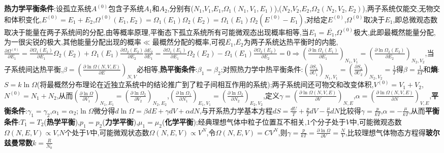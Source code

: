 \documentclass[10pt,a4paper]{article}
\begin{document}
\begin{multicols}{2}
\textbf{热力学平衡条件}:设孤立系统$A^{(0)}$包含子系统$A_1$和$A_2$,分别有($N_1$,$V_1$,$E_1$,$\Omega_1(N_1,V_1,E_1)$),($N_2$,$V_2$,$E_2$,$\Omega_2(N_2,V_2,E_2)$),两子系统仅能交,无物交和体积变化,$E^{(0)}=E_1+E_2$,$\Omega^{(0)}(E_1,E_2)=\Omega_1(E_1)\Omega_2(E_2)=\Omega_1(E_1)\Omega_2(E^{(0)}-E_1)$,对给定$E^{(0)}$,$\Omega^{(0)}$取决于$E_1$,即总微观态数取决于能量在两子系统间的分配,由等概率原理,平衡态下孤立系统所有可能微观态出现概率相等,当$E_1=\overline{E_1}$,$\Omega^{(0)}$极大,此即最概然能量分配,为一很尖锐的极大,其他能量分配出现的概率$\ll$最概然分配的概率,可视$\overline{E_1}$,$\overline{E_2}$为两子系统达热平衡时的内能,$\frac{\partial\Omega^{(0)}}{\partial E_1}=\frac{\partial\Omega_1(E_1)}{\partial E_1}\Omega_2(E_2)+\Omega_1(E_1)\frac{\partial\Omega_2(E_2)}{\partial E_2}\frac{\partial E_2}{\partial E_1}=\frac{\partial\Omega_1(E_1)}{\partial E_1}\Omega_2(E_2)-\Omega_1(E_1)\frac{\partial\Omega_2(E_2)}{\partial E_2}=0\Rightarrow\left(\frac{\partial\ln\Omega_1(E_1)}{\partial E_1}\right)_{N_1,V_1}=\left(\frac{\partial\ln\Omega_2(E_2)}{\partial E_2}\right)_{N_2,V_2}$,当子系统间达热平衡,$\beta=\left(\frac{\partial\ln\Omega(N,V,E)}{\partial E}\right)_{N,V}$必相等,\textbf{热平衡条件}:$\beta_1=\beta_2$;对照热力学中热平衡条件:$\left(\frac{\partial S_1}{\partial U_1}\right)_{N_1,V_1}=\left(\frac{\partial S_2}{\partial U_2}\right)_{N_2,V_2}=\frac{1}{T}$得$\beta=\frac{1}{kT}$和\textbf{熵}:$S=k\ln\Omega$(将最概然分布理论在近独立系统中的结论推广到了粒子间相互作用的系统);两子系统间还可物交和改变体积,$V^{(0)}=V_1+V_2$,$N^{(0)}=N_1+N_2$,从而$\left(\frac{\partial\ln\Omega}{\partial V_1}\right)_{N_1,E_1}=\left(\frac{\partial\ln\Omega_2}{\partial V_2}\right)_{N_2,E_2}$,$\left(\frac{\partial\ln\Omega_1}{\partial N_1}\right)_{E_1,V_1}=\left(\frac{\partial\ln\Omega_2}{\partial N_2}\right)_{E_2,V_2}$,定义$\gamma=\left(\frac{\partial\ln\Omega(N,V,E)}{\partial V}\right)_{N,E}$,$\alpha=\left(\frac{\partial\ln\Omega(N,V,E)}{\partial N}\right)_{V,E}$,\textbf{平衡条件}:$\gamma_1=\gamma_2$,$\alpha_1=\alpha_2$;$\ln\Omega$微分得$d\ln\Omega=\beta dE+\gamma dV+\alpha dN$,与开系热力学基本方程$dS=\frac{dU}{T}+\frac{p}{T}dV-\frac{\mu}{T}dN$比较得$\gamma=\frac{p}{kT}$,$\alpha=-\frac{\mu}{kT}$,从而\textbf{平衡条件}:$T_1=T_2$(\textbf{热学平衡}),$p_1=p_2$(\textbf{力学平衡}),$\mu_1=\mu_2$(\textbf{化学平衡});经典理想气体中粒子位置互不相关,$1$个分子处于$V$中,可能微观态数$\Omega(N,E,V)\propto V$,$N$个处于$V$中,可能微观状态数$\Omega(N,E,V)\propto V^N$,令$\Omega(N,E,V)=CV^N$,则$\gamma=\frac{p}{kT}=\frac{\partial\ln\Omega}{\partial V}=\frac{N}{V}$,比较理想气体物态方程得\textbf{玻尔兹曼常数}$k=\frac{R}{N_0}$\\

\end{multicols}
\end{document}
